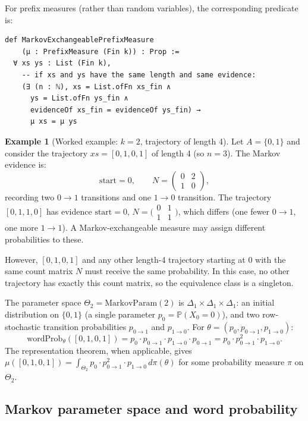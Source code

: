 \documentclass[11pt]{article}
\theoremstyle{definition}
\newtheorem{example}[theorem]{Example}
\newcommand{\Prob}{\mathbb{P}}
\begin{document}
For prefix measures (rather than random variables), the corresponding
predicate is:

\begin{lstlisting}
def MarkovExchangeablePrefixMeasure
    (μ : PrefixMeasure (Fin k)) : Prop :=
  ∀ xs ys : List (Fin k),
    -- if xs and ys have the same length and same evidence:
    (∃ (n : ℕ), xs = List.ofFn xs_fin ∧
      ys = List.ofFn ys_fin ∧
      evidenceOf xs_fin = evidenceOf ys_fin) →
      μ xs = μ ys
\end{lstlisting}

\begin{example}[Worked example: $k=2$, trajectory of length 4]
\label{ex:worked}
Let $A = \{0, 1\}$ and consider the trajectory $xs = [0, 1, 0, 1]$ of
length 4 (so $n = 3$).  The Markov evidence is:
\[
\mathrm{start} = 0, \qquad
N = \begin{pmatrix} 0 & 2 \\ 1 & 0 \end{pmatrix},
\]
recording two $0 \to 1$ transitions and one $1 \to 0$ transition.
The trajectory $[0, 1, 1, 0]$ has evidence
$\mathrm{start} = 0$,
$N = \bigl(\begin{smallmatrix} 0 & 1 \\ 1 & 1 \end{smallmatrix}\bigr)$,
which differs (one fewer $0 \to 1$, one more $1 \to 1$).
A Markov-exchangeable measure may assign different probabilities to these.

However, $[0, 1, 0, 1]$ and any other length-4 trajectory starting at $0$
with the same count matrix $N$ must receive the same probability.  In this
case, no other trajectory has exactly this count matrix, so the equivalence
class is a singleton.

The parameter space $\Theta_2 = \mathrm{MarkovParam}(2)$ is
$\Delta_1 \times \Delta_1 \times \Delta_1$: an initial distribution on
$\{0,1\}$ (a single parameter $p_0 = \Prob(X_0 = 0)$), and two
row-stochastic transition probabilities $p_{0 \to 1}$ and $p_{1 \to 0}$.
For $\theta = (p_0, p_{0\to1}, p_{1\to0})$:
\[
\mathrm{wordProb}_\theta([0,1,0,1])
= p_0 \cdot p_{0\to1} \cdot p_{1\to0} \cdot p_{0\to1}
= p_0 \cdot p_{0\to1}^2 \cdot p_{1\to0}.
\]
The representation theorem, when applicable, gives
$\mu([0,1,0,1]) = \int_{\Theta_2} p_0 \cdot p_{0\to1}^2 \cdot p_{1\to0}\, d\pi(\theta)$
for some probability measure $\pi$ on $\Theta_2$.
\end{example}

\subsection{Markov parameter space and word probability}
\end{document}
